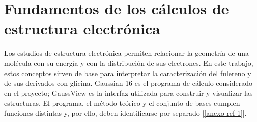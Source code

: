 \documentclass[12 pt, letter, oneside]{book}
\begin{document}
\tableofcontents 
\newpage
\fancyhf{}
\fancyfoot[RO,LE]{\thepage}
\fancyhead[RE]{\nouppercase{\leftmark}}
\fancyhead[LO]{\nouppercase{\rightmark}}
\renewcommand\headrulewidth{0pt}
\makeatletter
\def\headrule{{\if@fancyplain\let\headrulewidth\plainheadrulewidth\fi
\hrule\@height\headrulewidth\@width\headwidth
\vskip 2pt%
\hrule\@height1pt\@width\headwidth%
\vskip-\headrulewidth
\vskip -10pt}} %
\makeatother
\let\oldheadrule\headrule%
\renewcommand{\headrule}{\color{r4}\oldheadrule}%
\renewcommand{\headrulewidth}{2.5 pt}
\let\oldfootrule
\footrule 
\renewcommand{\footrule}{\color{black}\oldfootrule}
\renewcommand{\footrulewidth}{2 pt}
\makeatletter
\patchcmd{\f@nch@foot}{\rlap}{\color{Black}\rlap}{}{}
\patchcmd{\footrule}{\hrule}{\color{Black}\hrule}{}{}
\makeatletter
\fancyhead{}
%
\mainmatter 
\fancyfoot{}
\fancyfoot[RO,LE]{\thepage}
\fancyhead{}










%             
%                  
\clearpage
\appendix
\chapter{Fundamentos de los cálculos de estructura electrónica}
\label{ap:fundamentos-gaussian}

Los estudios de estructura electrónica permiten relacionar la geometría de una molécula con su energía y con la distribución de sus electrones. En este trabajo, estos conceptos sirven de base para interpretar la caracterización del fulereno y de sus derivados con glicina. Gaussian 16 es el programa de cálculo considerado en el proyecto; GaussView es la interfaz utilizada para construir y visualizar las estructuras. El programa, el método teórico y el conjunto de bases cumplen funciones distintas y, por ello, deben identificarse por separado [\ref{anexo-ref-1}].
\end{document}

